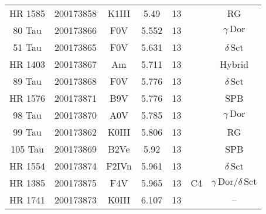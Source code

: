\begin{table*}
\begin{tabular}{ccccccc}
HR 1585 & 200173858 & K1III & 5.49 & 13 &  & RG \\
80 Tau & 200173866 & F0V & 5.552 & 13 &  & $\gamma\,\text{Dor}$ \\
51 Tau & 200173865 & F0V & 5.631 & 13 &  & $\delta\,\text{Sct}$ \\
HR 1403 & 200173867 & Am & 5.711 & 13 &  & Hybrid \\
89 Tau & 200173868 & F0V & 5.776 & 13 &  & $\delta\,\text{Sct}$ \\
HR 1576 & 200173871 & B9V & 5.776 & 13 &  & SPB \\
98 Tau & 200173870 & A0V & 5.785 & 13 &  & $\gamma\,\text{Dor}$ \\
99 Tau & 200173862 & K0III & 5.806 & 13 &  & RG \\
105 Tau & 200173869 & B2Ve & 5.92 & 13 &  & SPB \\
HR 1554 & 200173874 & F2IVn & 5.961 & 13 &  & $\delta\,\text{Sct}$ \\
HR 1385 & 200173875 & F4V & 5.965 & 13 & C4 & $\gamma\,\text{Dor} /\delta\,\text{Sct}$ \\
HR 1741 & 200173873 & K0III & 6.107 & 13 &  & -- \\
\hline
\end{tabular}
\end{table*}
